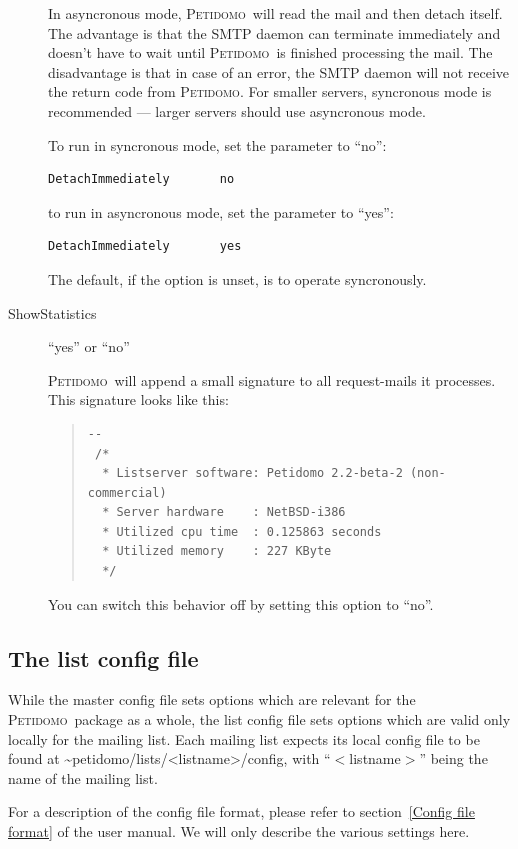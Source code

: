 \documentclass[a4paper,10pt]{scrreprt}
\newcommand{\Petidomo}{{\scshape Peti\-domo}}
\newcommand{\file}[1]{{\sf #1}}
\begin{document}
\begin{description}
In asyncronous mode, \Petidomo\ will read the mail and then detach
itself. The advantage is that the SMTP daemon can terminate
immediately and doesn't have to wait until \Petidomo\ is finished
processing the mail. The disadvantage is that in case of an error, the
SMTP daemon will not receive the return code from \Petidomo. For
smaller servers, syncronous mode is recommended --- larger servers
should use asyncronous mode.

To run in syncronous mode, set the parameter to ``no'':
\begin{verbatim}
DetachImmediately       no
\end{verbatim}
to run in asyncronous mode, set the parameter to ``yes'':
\begin{verbatim}
DetachImmediately       yes
\end{verbatim}

The default, if the option is unset, is to operate syncronously.

\item[ShowStatistics] \hfill ``yes'' or ``no''

\Petidomo\ will append a small signature to all request-mails it
processes. This signature looks like this:

\begin{quote}
\begin{verbatim}
--
 /*
  * Listserver software: Petidomo 2.2-beta-2 (non-commercial)
  * Server hardware    : NetBSD-i386
  * Utilized cpu time  : 0.125863 seconds
  * Utilized memory    : 227 KByte
  */
\end{verbatim}
\end{quote}

You can switch this behavior off by setting this option to ``no''.

\end{description}

\subsection{The list config file}
\label{list config file}

While the master config file sets options which are relevant for the
\Petidomo\ package as a whole, the list config file sets
options which are valid only locally for the mailing list. Each
mailing list expects its local config file to be found at
\file{\~{}petidomo/lists/<listname>/config}, with ``$<$listname$>$''
being the name of the mailing list.

For a description of the config file format, please refer to
section~\ref{Config file format} of the user manual. We will only
describe the various settings here.
\end{document}
